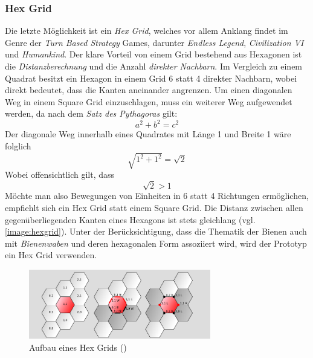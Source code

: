 \subsubsection{Hex Grid}
Die letzte Möglichkeit ist ein \textit{Hex Grid}, welches vor allem Anklang findet im Genre der \textit{Turn Based Strategy} Games, darunter \textit{Endless Legend}, \textit{Civilization VI} und \textit{Humankind}. Der klare Vorteil von einem Grid bestehend aus Hexagonen ist die \textit{Distanzberechnung} und die Anzahl \textit{direkter Nachbarn}. Im Vergleich zu einem Quadrat besitzt ein Hexagon in einem Grid 6 statt 4 direkter Nachbarn, wobei direkt bedeutet, dass die Kanten aneinander angrenzen. Um einen diagonalen Weg in einem Square Grid einzuschlagen, muss ein weiterer Weg aufgewendet werden, da nach dem \textit{Satz des Pythagoras} gilt:
\begin{equation}
    a^2 + b^2 = c^2
\end{equation}
Der diagonale Weg innerhalb eines Quadrates mit Länge 1 und Breite 1 wäre folglich 
\begin{equation}
    \sqrt{1^2 + 1^2} = \sqrt{2}
\end{equation}
Wobei offensichtlich gilt, dass
\begin{equation}
    \sqrt{2} > 1
\end{equation}
Möchte man also Bewegungen von Einheiten in 6 statt 4 Richtungen ermöglichen, empfiehlt sich ein Hex Grid statt einem Square Grid. Die Distanz zwischen allen gegenüberliegenden Kanten eines Hexagons ist stets gleichlang (vgl. \autoref{image:hexgrid}). Unter der Berücksichtigung, dass die Thematik der Bienen auch mit \textit{Bienenwaben} und deren hexagonalen Form assoziiert wird, wird der Prototyp ein Hex Grid verwenden. 
\begin{figure}
    \begin{center}
        \includegraphics[width=300px]{0.bilder/hexgrid.png}
    \end{center}
    \caption{Aufbau eines Hex Grids (\cite{world:grids})} \label{image:hexgrid}
\end{figure}